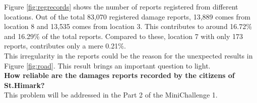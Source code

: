 \documentclass[12pt]{extarticle}
\begin{document}
Figure \ref{fig:regrecords} shows the number of reports registered from different locations. Out of the total 83,070 registered damage reports, 13,889 comes from location 8 and 13,535 comes from location 3. This contributes to around 16.72\% and 16.29\% of the total reports. Compared to these, location 7 with only 173 reports, contributes only a mere 0.21\%. \\

This irregularity in the reports could be the reason for the unexpected results in Figure \ref{fig:road}. This result brings an important question to light. \\

\noindent
\textbf{How reliable are the damages reports recorded by the citizens of St.Himark? } \\

\noindent
This problem will be addressed in the Part 2 of the MiniChallenge 1. 
\end{document}
